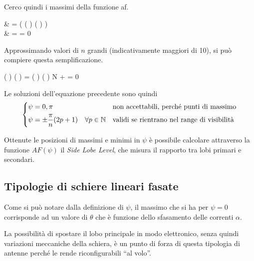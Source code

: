 			Cerco quindi i massimi della funzione \gls{af}.
			
			\begin{esp}
				& = \deriv{}{\psi} \left(
						\frac
							{ \sin(\frac{n}{2} \psi) }
							{ \sin( \frac{\psi}{2} ) }
					\right) \\
				& = \frac{1}{\sin^2 \frac{\psi}{2}} \left[
					\cos \left( \psi \right) \frac{n}{2} \sin\left(  \right) 
					- \sin \left(\frac{n}{2} \psi \right) \cos\left( \frac{\psi}{2} \right)
					\right]
				 = 0
			\end{esp} 
			
			Approssimando valori di $n$ grandi (indicativamente maggiori di 10), si può compiere questa semplificazione.
			
			\begin{esp}
				\cos \left( \psi \right) \sin\left( \frac{\psi}{2} \right)
				=  \sin \left( \psi \right) \cos\left( \frac{\psi}{2} \right)
				 \quad \forall N \to +\infty
				 = 0
			\end{esp} 
			
			Le soluzioni dell'equazione precedente sono quindi
			\begin{equation*}
				\begin{dcases}
					\psi = 0, \pi 
						& \text{non accettabili, perché punti di massimo} \\
					\psi = \pm \frac{\pi}{n} (2p + 1) \quad \forall p \in \mathbb{N}
						& \text{validi se rientrano nel range di visibilità}
				\end{dcases}
			\end{equation*}

			Ottenute le posizioni di massimi e minimi in $\psi$ è possibile calcolare attraverso la funzione $AF(\psi)$ il \emph{Side Lobe Level}, che misura il rapporto tra lobi primari e secondari.

	\subsection{Tipologie di schiere lineari fasate}
		Come si può notare dalla definizione di $\psi$, il massimo che si ha per $\psi = 0$ corrisponde ad un valore di $\theta$ che è funzione dello sfasamento delle correnti $\alpha$.
		
		La possibilità di spostare il lobo principale in modo elettronico, senza quindi variazioni meccaniche della schiera, è un punto di forza di questa tipologia di antenne perché le rende riconfigurabili ``al volo''.
		
